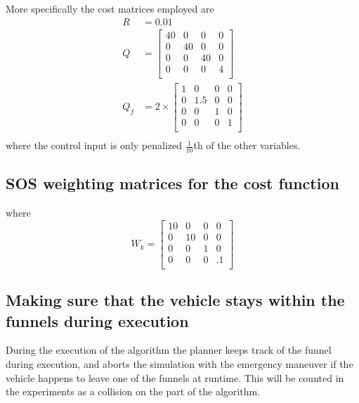 More specifically the cost matrices employed are
\begin{align*}
  R &= 0.01 \\
  Q &= \begin{bmatrix}
    40 & 0 & 0 & 0 \\
    0 & 40 & 0 & 0 \\
    0 & 0 & 40 & 0 \\
    0 & 0 & 0 & 4 \\
  \end{bmatrix}
  \\
  Q_{f} &=
          2\times
  \begin{bmatrix}
    1 & 0 & 0 & 0 \\
    0 & 1.5 & 0 & 0 \\
    0 & 0 & 1 & 0 \\
    0 & 0 & 0 & 1 \\
  \end{bmatrix}
\\
\end{align*}
where the control input is only penalized \(\frac{1}{10}\)th of the other
variables.

\subsection{SOS weighting matrices for the cost function}

where
\begin{equation}
  W_{k} =
  \begin{bmatrix}
    10 & 0 & 0 & 0 \\
    0 & 10 & 0 & 0 \\
    0 & 0 & 1 & 0 \\
    0 & 0 & 0 & .1 \\
  \end{bmatrix}
\end{equation}

\subsection{Making sure that the vehicle stays within the funnels during execution}

During the execution of the \rrtfunnel{} algorithm the planner keeps track of
the funnel during execution, and aborts the simulation with the emergency
maneuver if the vehicle happens to leave one of the funnels at runtime. This
will be counted in the experiments as a collision on the part of the
\rrtfunnel{} algorithm.

